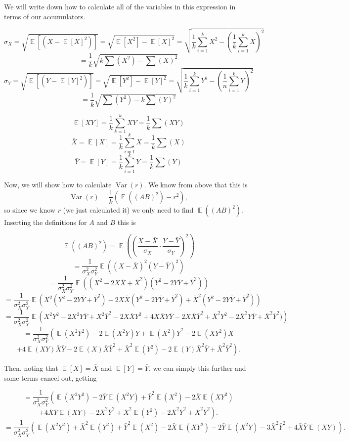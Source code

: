 \documentclass{article}
\DeclareMathOperator{\E}{\mathbb{E}}
\DeclareMathOperator{\Var}{\mathrm{Var}}
\begin{document}
We will write down how to calculate all of the variables in this expression in terms of our accumulators.

$$\sigma_X = \sqrt{\E[(X - \E[X]^2)]}
= \sqrt{\E[X^2] - \E[X]^2}
= \sqrt{\frac{1}{k} \sum_{i = 1}^k X^2 - \left(\frac{1}{k} \sum_{i=1}^k X \right)^2}$$
$$= \frac{1}{k} \sqrt{k\sum(X^2) - \sum(X)^2}
$$
$$\sigma_Y = \sqrt{\E[(Y - \E[Y]^2)]}
= \sqrt{\E[Y^2] - \E[Y]^2}
= \sqrt{\frac{1}{k} \sum_{i = 1}^k Y^2 - \left(\frac{1}{n} \sum_{i=1}^k Y \right)^2}$$
$$= \frac{1}{k} \sqrt{\sum(Y^2) - k\sum(Y)^2}
$$
 
$$\E[XY] = \frac{1}{k} \sum_{k = 1}^k X Y = \frac{1}{k} \sum(XY)$$
$$\bar X = \E[X] = \frac{1}{k} \sum_{i = 1}^k X = \frac{1}{k} \sum(X)$$
$$\bar Y = \E[Y] = \frac{1}{k} \sum_{i = 1}^k Y = \frac{1}{k} \sum(Y)$$

Now, we will show how to calculate $\Var(r).$ We know from above that this is
$$\Var(r) = \frac{1}{k}\left(\E((AB)^2) - r^2\right),$$
so since we know $r$ (we just calculated it) we only need to find $\E((AB)^2)$. Inserting the definitions for $A$ and $B$ this is

$$\E((AB)^2) = \E\left(\left(\frac{X - \bar X}{\sigma_X} \cdot \frac{Y - \bar Y}{\sigma_Y} \right)^2 \right)$$
$$ = \frac{1}{\sigma_X^2 \sigma_Y^2}\E\left((X - \bar X)^2(Y - \bar Y)^2 \right)$$
$$= \frac{1}{\sigma_X^2 \sigma_Y^2}\E\left((X^2 - 2X\bar X + \bar X^2)(Y^2 - 2Y\bar Y + \bar Y^2) \right)$$
$$= \frac{1}{\sigma_X^2 \sigma_Y^2}\E\left(X^2(Y^2 - 2Y\bar Y + \bar Y^2) - 2X\bar X(Y^2 - 2Y\bar Y + \bar Y^2) + \bar X^2(Y^2 - 2Y\bar Y + \bar Y^2) \right)$$
$$= \frac{1}{\sigma_X^2 \sigma_Y^2}\E\left(X^2Y^2 - 2X^2Y\bar Y + X^2\bar Y^2 - 2X\bar X Y^2 + 4X\bar XY\bar Y  - 2X\bar X \bar Y^2 + \bar X^2Y^2 - 2\bar X^2Y\bar Y + \bar X^2\bar Y^2) \right)$$
$$= \frac{1}{\sigma_X^2 \sigma_Y^2}\left(\E(X^2Y^2) - 2\E(X^2Y)\bar Y + \E(X^2)\bar Y^2 - 2\E(XY^2)\bar X\right.$$ 
$$\left. + 4\E(XY) \bar X\bar Y  - 2\E(X) \bar X \bar Y^2 + \bar X^2 \E(Y^2) - 2\E(Y)\bar X^2\bar Y + \bar X^2\bar Y^2 \right).$$

Then, noting that $\E[X] = \bar X$ and $\E[Y] = \bar Y$, we can simply this further and some terms cancel out, getting

$$= \frac{1}{\sigma_X^2 \sigma_Y^2}\left(\E(X^2Y^2) - 2\bar Y \E(X^2Y)+ \bar Y^2\E(X^2) - 2\bar X\E(XY^2) \right.$$ 
$$\left. + 4\bar X\bar Y \E(XY) - 2\bar X^2 \bar Y^2 + \bar X^2 \E(Y^2) - 2\bar X^2 \bar Y^2 + \bar X^2 \bar Y^2 \right).$$
$$= \frac{1}{\sigma_X^2 \sigma_Y^2}\left(\E(X^2Y^2)  + \bar X^2 \E(Y^2) + \bar Y^2\E(X^2) - 2\bar X\E(XY^2) - 2\bar Y \E(X^2Y)  - 3 \bar X^2 \bar Y^2 + 4\bar X\bar Y \E(XY)\right).$$
\end{document}
